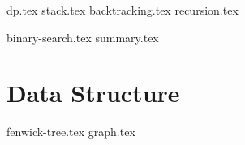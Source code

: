 \documentclass{../latex-setting/cmemoir}
\begin{document}

\frontmatter

\tableofcontents

\restoregeometry%

\mainmatter{}


{dp.tex}
{stack.tex}
{backtracking.tex}
{recursion.tex}

{binary-search.tex}
{summary.tex}



\part{Data Structure}
{fenwick-tree.tex}
{graph.tex}
% 
\end{document}
